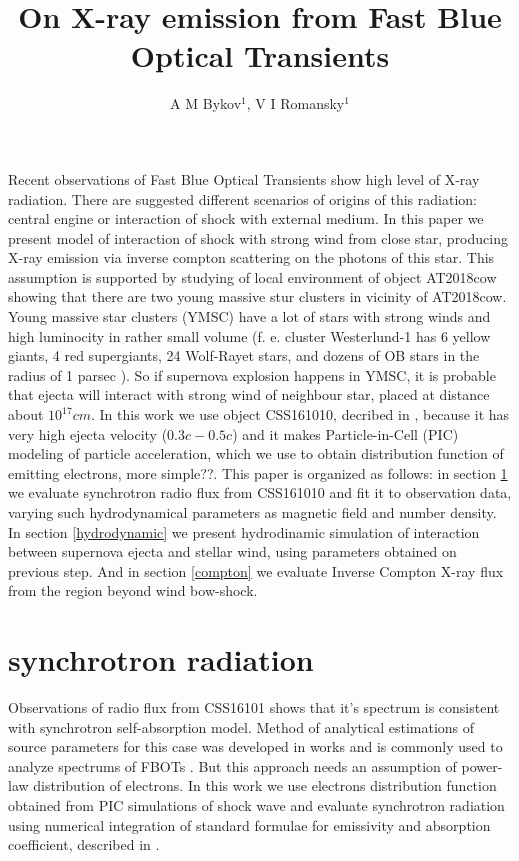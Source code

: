 \documentclass[a4paper,12pt]{extreport}
\begin{document}
	\title{On X-ray emission from Fast Blue Optical Transients}
	
	\author{A M Bykov$^{1}$, V I Romansky$^{1}$}
	

Recent observations of Fast Blue Optical Transients \cite{Margutti2019, Ho2019cow,Ho2020koala,Coppejans2020, Ho2021at2020, YaoAt2020mrf} show high level of X-ray radiation. There are suggested different scenarios of  origins of this radiation: central engine or interaction of shock with external medium. In this paper we present model of interaction of shock with strong wind from close star, producing X-ray emission via inverse compton scattering on the photons of this star. This assumption is supported by studying of local environment of object AT2018cow \cite{SunAT2018environment} showing that there are two young massive stur clusters in vicinity of AT2018cow. Young massive star clusters (YMSC) have a lot of stars with strong winds and high luminocity in rather small volume (f. e. cluster Westerlund-1 has 6 yellow giants, 4 red supergiants, 24 Wolf-Rayet stars, and dozens of OB stars in the radius of 1 parsec \cite{Clark2005westerlund, Crowther2006westerlund, Negueruela2010westerlund}). So if supernova explosion happens in YMSC, it is probable that ejecta will interact with strong wind of neighbour star, placed at distance about $10^{17}  cm$.  In this work we use object CSS161010, decribed in \cite{Coppejans2020}, because it has very high ejecta velocity ($0.3 c - 0.5 c$) and it makes Particle-in-Cell (PIC) modeling of particle acceleration, which we use to obtain distribution function of emitting electrons, more simple??. This paper is organized as follows: in section \ref{synchrotron} we evaluate synchrotron radio flux from CSS161010 and fit it to observation data, varying such hydrodynamical parameters as magnetic field and number density. In section \ref{hydrodynamic} we present hydrodinamic simulation of interaction between supernova ejecta and stellar wind, using parameters obtained on previous step. And in section \ref{compton} we evaluate Inverse Compton X-ray flux from the region beyond wind bow-shock.

\section{synchrotron radiation}\label{synchrotron}
Observations of radio flux from CSS16101 \cite{Coppejans2020} shows that it's spectrum is consistent with synchrotron self-absorption model. Method of analytical estimations of source parameters for this case was developed in works \cite{Chevalier1998, ChevalierFransson} and is commonly used to analyze spectrums of FBOTs \cite{Ho2019cow, Ho2020koala, Coppejans2020, Ho2021at2020}. But this approach needs an assumption of power-law distribution of electrons. In this work we use electrons distribution function obtained from PIC simulations of shock wave and evaluate synchrotron radiation using numerical integration of standard formulae for emissivity and absorption coefficient, described in \cite{Ginzburg1975, Ghisellini}.
\end{document}
